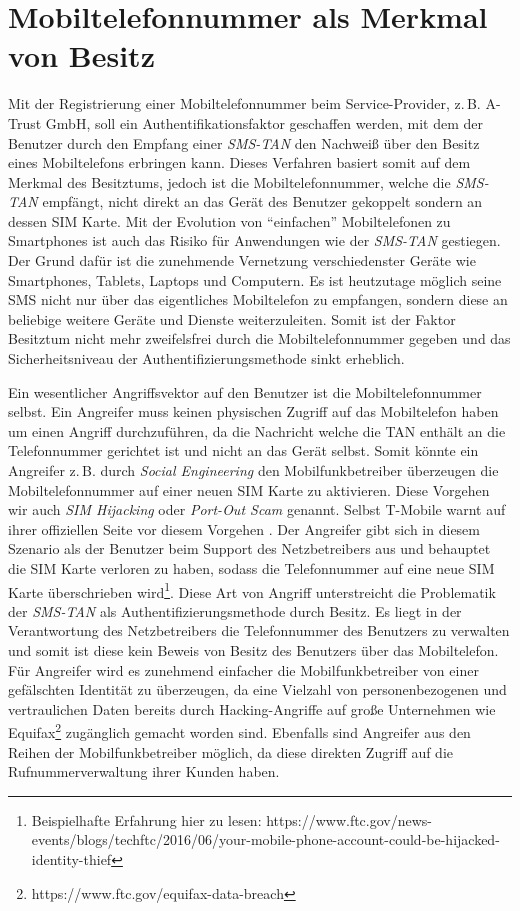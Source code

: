 \documentclass[11pt,a4paper,ngerman]{scrreprt}
\begin{document}
\section{Mobiltelefonnummer als Merkmal von Besitz}
Mit der Registrierung einer Mobiltelefonnummer beim Service-Provider, z.\,B. A-Trust GmbH, soll ein Authentifikationsfaktor geschaffen werden, mit dem der Benutzer durch den Empfang einer \textit{SMS-TAN} den Nachweiß über den Besitz eines Mobiltelefons erbringen kann. Dieses Verfahren basiert somit auf dem Merkmal des Besitztums, jedoch ist die Mobiltelefonnummer, welche die \textit{SMS-TAN} empfängt, nicht direkt an das Gerät des Benutzer gekoppelt sondern an dessen SIM Karte. Mit der Evolution von ``einfachen'' Mobiltelefonen zu Smartphones ist auch das Risiko für Anwendungen wie der \textit{SMS-TAN} gestiegen. Der Grund dafür ist die zunehmende Vernetzung verschiedenster Geräte wie Smartphones, Tablets, Laptops und Computern. Es ist heutzutage möglich seine SMS nicht nur über das eigentliches Mobiltelefon zu empfangen, sondern diese an beliebige weitere Geräte und Dienste weiterzuleiten. Somit ist der Faktor Besitztum nicht mehr zweifelsfrei durch die Mobiltelefonnummer gegeben und das Sicherheitsniveau der Authentifizierungsmethode sinkt erheblich.

Ein wesentlicher Angriffsvektor auf den Benutzer ist die Mobiltelefonnummer selbst. Ein Angreifer muss keinen physischen Zugriff auf das Mobiltelefon haben um einen Angriff durchzuführen, da die Nachricht welche die TAN enthält an die Telefonnummer gerichtet ist und nicht an das Gerät selbst. Somit könnte ein Angreifer z.\,B. durch \emph{Social Engineering} den Mobilfunkbetreiber überzeugen die Mobiltelefonnummer auf einer neuen SIM Karte zu aktivieren. Diese Vorgehen wir auch \emph{SIM Hijacking} oder \emph{Port-Out Scam} genannt. Selbst T-Mobile warnt auf ihrer offiziellen Seite vor diesem Vorgehen \cite{telekomPortOut}. Der Angreifer gibt sich in diesem Szenario als der Benutzer beim Support des Netzbetreibers aus und behauptet die SIM Karte verloren zu haben, sodass die Telefonnummer auf eine neue SIM Karte überschrieben wird\footnote{Beispielhafte Erfahrung hier zu lesen: https://www.ftc.gov/news-events/blogs/techftc/2016/06/your-mobile-phone-account-could-be-hijacked-identity-thief}. Diese Art von Angriff unterstreicht die Problematik der \textit{SMS-TAN} als Authentifizierungsmethode durch Besitz. Es liegt in der Verantwortung des Netzbetreibers die Telefonnummer des Benutzers zu verwalten und somit ist diese kein Beweis von Besitz des Benutzers über das Mobiltelefon. Für Angreifer wird es zunehmend einfacher die Mobilfunkbetreiber von einer gefälschten Identität zu überzeugen, da eine Vielzahl von personenbezogenen und vertraulichen Daten bereits durch Hacking-Angriffe auf große Unternehmen wie Equifax\footnote{https://www.ftc.gov/equifax-data-breach} zugänglich gemacht worden sind. Ebenfalls sind Angreifer aus den Reihen der Mobilfunkbetreiber möglich, da diese direkten Zugriff auf die Rufnummerverwaltung ihrer Kunden haben.
\end{document}
